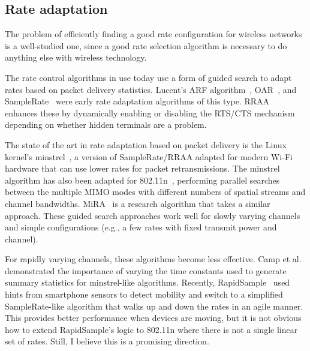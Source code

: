 \subsection{Rate adaptation}
The problem of efficiently finding a good rate configuration for wireless networks is a well-studied one, since a good rate selection algorithm is necessary to do anything else with wireless technology.

The rate control algorithms in use today use a form of guided search to adapt rates based on packet delivery statistics. Lucent's ARF algorithm~\cite{Kamerman_ARF}, OAR~\cite{Sadeghi_OAR}, and SampleRate~\cite{Bicket_SampleRate} were early rate adaptation algorithms of this type. RRAA~\cite{Wong_RRAA} enhances these by dynamically enabling or disabling the RTS/CTS mechanism depending on whether hidden terminals are a problem.

The state of the art in rate adaptation based on packet delivery is the Linux kernel's minstrel~\cite{minstrel}, a version of SampleRate/RRAA adapted for modern Wi-Fi hardware that can use lower rates for packet retransmissions. The minstrel algorithm has also been adapted for 802.11n~\cite{minstrel_ht}, performing parallel searches between the multiple MIMO modes with different numbers of spatial streams and channel bandwidths. MiRA~\cite{Pefkianakis_MiRA} is a research algorithm that takes a similar approach. These guided search approaches work well for slowly varying channels and simple configurations (e.g., a few rates with fixed transmit power and channel).

For rapidly varying channels, these algorithms become less effective. Camp et al.~\cite{Camp_rateadapt} demonstrated the importance of varying the time constants used to generate summary statistics for minstrel-like algorithms. Recently, RapidSample~\cite{Ravindranath_SensorHints} used hints from smartphone sensors to detect mobility and switch to a simplified SampleRate-like algorithm that walks up and down the rates in an agile manner. This provides better performance when devices are moving, but it is not obvious how to extend RapidSample's logic to 802.11n where there is not a single linear set of rates. Still, I believe this is a promising direction.

